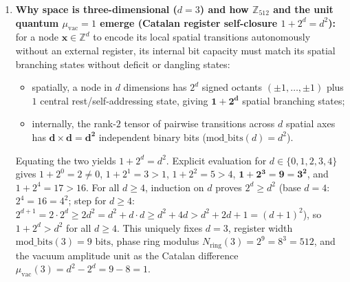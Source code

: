 \documentclass[11pt,a4paper]{article}
\theoremstyle{plain}
\theoremstyle{definition}
\begin{document}
\begin{enumerate}[label=\textbf{Step \arabic*.},leftmargin=*]
\item \textbf{Why space is three-dimensional ($d = 3$) and how $\mathbb{Z}_{512}$ and the unit quantum $\mu_{\mathrm{vac}} = 1$ emerge (Catalan register self-closure $1 + 2^d = d^2$):}
  for a node $\mathbf{x}\in\mathbb{Z}^d$ to encode its local spatial transitions autonomously without an external register, its internal bit capacity must match its spatial branching states without deficit or dangling states:
  \begin{itemize}[noitemsep]
  \item spatially, a node in $d$ dimensions has $2^d$ signed octants $(\pm 1,\dots,\pm 1)$ plus $1$ central rest/self-addressing state, giving $\mathbf{1 + 2^d}$ spatial branching states;
  \item internally, the rank-$2$ tensor of pairwise transitions across $d$ spatial axes has $\mathbf{d\times d = d^2}$ independent binary bits ($\mathrm{mod\_bits}(d) = d^2$).
  \end{itemize}
  Equating the two yields $1 + 2^d = d^2$. Explicit evaluation for $d\in\{0,1,2,3,4\}$ gives $1+2^0=2\ne 0$, $1+2^1=3>1$, $1+2^2=5>4$, $\mathbf{1+2^3=9=3^2}$, and $1+2^4=17>16$. For all $d\ge 4$, induction on $d$ proves $2^d\ge d^2$ (base $d=4$: $2^4=16=4^2$; step for $d\ge 4$: $2^{d+1} = 2\cdot 2^d \ge 2d^2 = d^2 + d\cdot d \ge d^2 + 4d > d^2 + 2d + 1 = (d+1)^2$), so $1 + 2^d > d^2$ for all $d\ge 4$. This uniquely fixes $d = 3$, register width $\mathrm{mod\_bits}(3) = 9\text{ bits}$, phase ring modulus $N_{\mathrm{ring}}(3) = 2^9 = 8^3 = 512$, and the vacuum amplitude unit as the Catalan difference $\mu_{\mathrm{vac}}(3) = d^2 - 2^d = 9 - 8 = 1$.


\end{enumerate}
\end{document}
